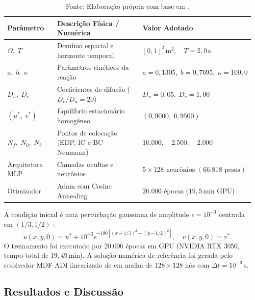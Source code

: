 \documentclass[a4paper, 12pt, twoside]{article}
\begin{document}
\begin{table}[ht]
\caption{Parâmetros físicos, dimensionais e hiperparâmetros de rede adotados conforme \textcite{pereira2019}.}
\label{tab:parametros}
\centering
\footnotesize
\setlength{\tabcolsep}{2.5pt}
\begin{tabular}{p{2.2cm}p{8.0cm}p{4.8cm}}
\toprule
\textbf{Parâmetro} & \textbf{Descrição Física / Numérica} & \textbf{Valor Adotado} \\
\midrule
$\Omega, \; T$ & Domínio espacial e horizonte temporal & $[0, 1]^2\,\text{m}^2, \quad T = 2{,}0\,\text{s}$ \\
$a, \; b, \; \kappa$ & Parâmetros cinéticos da reação & $a = 0{,}1305, \; b = 0{,}7695, \; \kappa = 100{,}0$ \\
$D_u, \; D_v$ & Coeficientes de difusão ($D_v/D_u = 20$) & $D_u = 0{,}05, \; D_v = 1{,}00$ \\
$(u^*, \; v^*)$ & Equilíbrio estacionário homogêneo & $(0{,}9000, \; 0{,}9500)$ \\
$N_f, \; N_0, \; N_b$ & Pontos de colocação (EDP, IC e BC Neumann) & $10.000, \quad 2.500, \quad 2.000$ \\
Arquitetura MLP & Camadas ocultas e neurônios & $5 \times 128 \text{ neurônios } (66.818 \text{ pesos})$ \\
Otimizador & Adam com Cosine Annealing & $20.000$ épocas ($19{,}5$\,min GPU) \\
\bottomrule
\end{tabular}
\caption*{Fonte: Elaboração própria com base em \textcite{pereira2019}.}
\end{table}

A condição inicial é uma perturbação gaussiana de amplitude $\epsilon = 10^{-3}$ centrada em $(1/3, 1/2)$ \parencite{pereira2019}:
\begin{equation}
  u(x, y, 0) = u^* + 10^{-3} e^{-100\left[(x - 1/3)^2 + (y - 1/2)^2\right]}, \quad v(x, y, 0) = v^*. \label{eq:ic_gauss}
\end{equation}
O treinamento foi executado por $20.000$ épocas em GPU (NVIDIA RTX 3050, tempo total de $19{,}49$\,min). A solução numérica de referência foi gerada pelo resolvedor MDF ADI linearizado de \textcite{pereira2019} em malha de $128 \times 128$ nós com $\Delta t = 10^{-3}\,\text{s}$.

\subsection{Resultados e Discussão}
\end{document}
